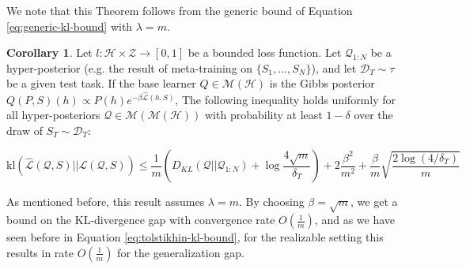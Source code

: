 \documentclass{article}
\theoremstyle{definition}
\newtheorem{corollary}[theorem]{Corollary}
\begin{document}
We note that this Theorem follows from the generic bound of Equation \ref{eq:generic-kl-bound} with $\lambda=m$.

\begin{corollary} \label{thm:kl-main-result}
	Let $l:\mathcal{H}\times \mathcal{Z}\rightarrow [0,1]$ be a bounded loss function.
	Let $\mathcal{Q}_{1:N}$ be a hyper-posterior (e.g. the result of meta-training on $\{S_1,...,S_N\}$), and let $\mathcal{D}_T\sim \tau$ be a given test task. 
	If the base learner $Q\in \mathcal{M}(\mathcal{H})$ is the Gibbs posterior $Q(P, S)(h)\propto P(h)e^{-\beta\hat{\mathcal{L}}(h, S)}$, 
	The following inequality holds uniformly for all hyper-posteriors $\mathcal{Q}\in \mathcal{M}(\mathcal{M}(\mathcal{H}))$ with probability at least $1-\delta$ over the draw of $S_T\sim \mathcal{D}_T$:
	
	$$\mathrm{kl}(\hat{\mathcal{L}}(\mathcal{Q},S)||\mathcal{L}(\mathcal{Q},S))\leq \frac{1}{m}\left (D_{KL}(\mathcal{Q}||\mathcal{Q}_{1:N})+\log\frac{4\sqrt{m}}{\delta_T} \right ) +2\frac{\beta^2}{m^2}+\frac{\beta}{m}\sqrt{\frac{2\log (4/\delta_T)}{m}} $$
	
\end{corollary}

As mentioned before, this result assumes $\lambda=m$. By choosing $\beta=\sqrt{m}$, we get a bound on the KL-divergence gap with convergence rate $O\left (\frac{1}{m}\right )$, 
and as we have seen before in Equation \ref{eq:tolstikhin-kl-bound}, for the realizable setting this results in rate $O\left (\frac{1}{m}\right )$ for the generalization gap.





\end{document}
